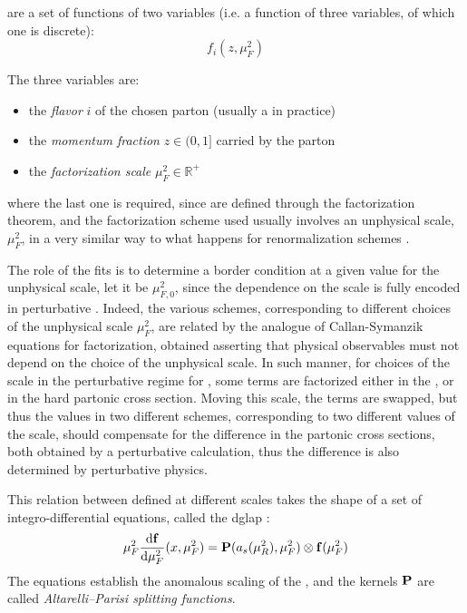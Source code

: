
\pdfs are a set of functions of two variables (i.e. a function of three
variables, of which one is discrete):
\begin{equation}
  f_i(z, \mu_F^2)
\end{equation}

The three variables are:
\begin{itemize}
  \item the \textit{flavor} $i$ of the chosen parton (usually a \pid in practice)
  \item the \textit{momentum fraction} $z \in (0,1]$ carried by the parton
  \item the \textit{factorization scale} $\mu_F^2 \in \mathbb{R}^+$
\end{itemize}
where the last one is required, since \pdfs are defined through the
factorization theorem, and the factorization scheme used usually involves an
unphysical scale, $\mu_F^2$, in a very similar way to what happens for
renormalization schemes \cite{Ellis:1996mzs}.

The role of the \pdf fits is to determine a border condition at a given value
for the unphysical scale, let it be $\mu_{F,0}^2$, since the dependence on the
scale is fully encoded in perturbative \qcd.
%
Indeed, the various schemes, corresponding to different choices of the
unphysical scale $\mu_F^2$, are related by the analogue of Callan-Symanzik
equations for factorization, obtained asserting that physical observables must
not depend on the choice of the unphysical scale.
%
In such manner, for choices of the scale in the perturbative regime for \qcd,
some terms are factorized either in the \pdf, or in the hard partonic cross
section.
Moving this scale, the terms are swapped, but thus the \pdf values in two
different schemes, corresponding to two different values of the scale, should
compensate for the difference in the partonic cross sections, both obtained by
a perturbative calculation, thus the difference is also determined by
perturbative physics.

This relation between \pdfs defined at different scales takes the shape of a
set of integro-differential equations, called the \acrfull{dglap}
\cite{Altarelli:1977zs,Gribov:1972ri,Dokshitzer:1977sg}:
\begin{equation}
	\muF^2 \dv{\vb f}{\muF^2}{}(x,\muF^2) = \vb P (a_s(\muR^2),\muF^2) \otimes \vb f(\muF^2)
	\label{eq:qcd/dglap}
\end{equation}
The equations establish the anomalous scaling of the \pdfs, and the kernels
${\vb P}$ are called \textit{Altarelli--Parisi splitting functions}.

